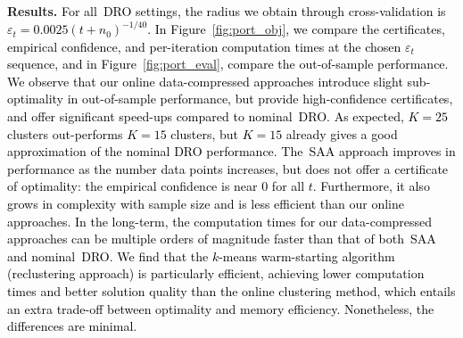 \documentclass[12pt]{article}
\renewcommand{\paragraph}[1]{\textbf{#1.}\;}
\newcommand{\epsnom}{\varepsilon}
\newcommand{\RC}[1]{\textcolor{black}{#1}}
\newcommand{\RC}[1]{\textcolor{blue}{#1}}
\begin{document}
\paragraph{Results}
\RC{For all~\gls{DRO} settings, the radius we obtain through cross-validation is  $\epsnom_t = 0.0025{(t+n_0)^{-1/40}}$.
In Figure~\ref{fig:port_obj}, we compare the certificates, empirical confidence, and per-iteration computation times at the chosen $\epsnom_t$ sequence, and in Figure~\ref{fig:port_eval}, compare the out-of-sample performance. 
We observe that our online data-compressed approaches introduce slight sub-optimality in out-of-sample performance, but provide high-confidence certificates, and offer significant speed-ups compared to nominal~\gls{DRO}. 
As expected, $K=25$ clusters out-performs $K=15$ clusters, but $K=15$ already gives a good approximation of the nominal \gls{DRO} performance.
The~\gls{SAA} approach improves in performance as the number data points increases, but does not offer a certificate of optimality: the empirical confidence is near 0 for all $t$. Furthermore, it also grows in complexity with sample size and is less efficient than our online approaches. In the long-term, the computation times for our data-compressed approaches can be multiple orders of magnitude faster than that of both~\gls{SAA} and nominal~\gls{DRO}. 
We find that the $k$-means warm-starting algorithm (reclustering approach) is particularly efficient, achieving lower computation times and better solution quality than the online clustering method, which entails an extra trade-off between optimality and memory efficiency. Nonetheless, the differences are minimal.}
\end{document}
